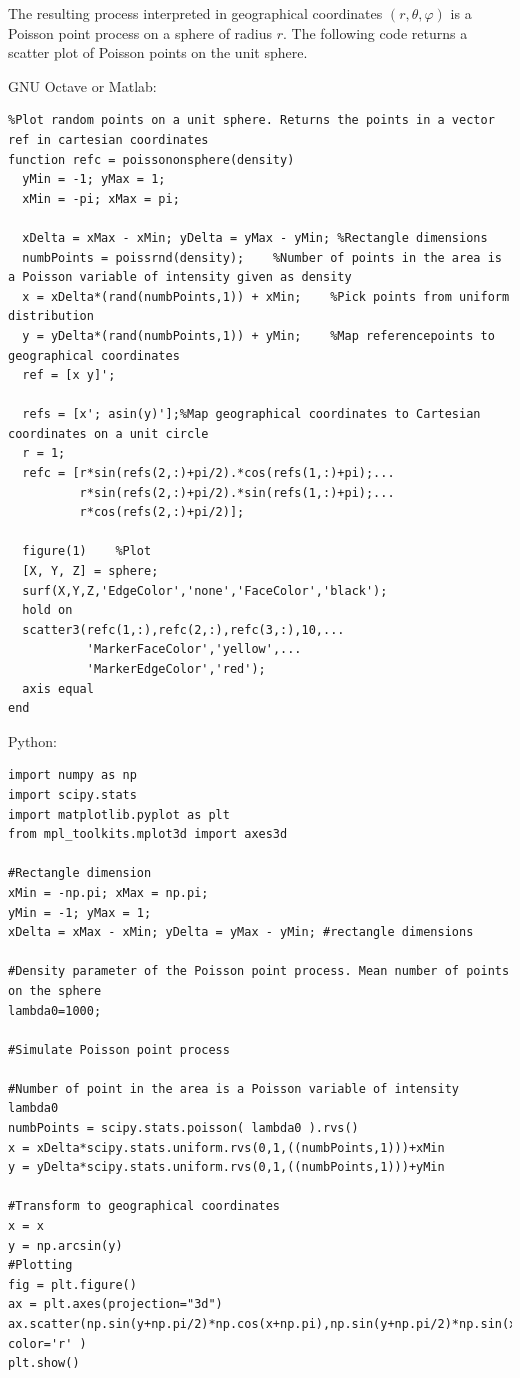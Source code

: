 \documentclass{article}
\begin{document}
        The resulting process interpreted in geographical coordinates $(r,\theta,\varphi)$ is a Poisson point process on a sphere of radius $r$. The following code returns a scatter plot of Poisson points on the unit sphere.



        GNU Octave or Matlab:
\begin{verbatim}
%Plot random points on a unit sphere. Returns the points in a vector ref in cartesian coordinates
function refc = poissononsphere(density)
  yMin = -1; yMax = 1;
  xMin = -pi; xMax = pi;
  
  xDelta = xMax - xMin; yDelta = yMax - yMin; %Rectangle dimensions
  numbPoints = poissrnd(density);    %Number of points in the area is a Poisson variable of intensity given as density
  x = xDelta*(rand(numbPoints,1)) + xMin;    %Pick points from uniform distribution
  y = yDelta*(rand(numbPoints,1)) + yMin;    %Map referencepoints to geographical coordinates
  ref = [x y]';

  refs = [x'; asin(y)'];%Map geographical coordinates to Cartesian coordinates on a unit circle
  r = 1;
  refc = [r*sin(refs(2,:)+pi/2).*cos(refs(1,:)+pi);...
          r*sin(refs(2,:)+pi/2).*sin(refs(1,:)+pi);...
          r*cos(refs(2,:)+pi/2)];

  figure(1)    %Plot
  [X, Y, Z] = sphere;
  surf(X,Y,Z,'EdgeColor','none','FaceColor','black');
  hold on
  scatter3(refc(1,:),refc(2,:),refc(3,:),10,...
           'MarkerFaceColor','yellow',...
           'MarkerEdgeColor','red');
  axis equal
end
\end{verbatim}

Python:

\begin{verbatim}
import numpy as np
import scipy.stats
import matplotlib.pyplot as plt
from mpl_toolkits.mplot3d import axes3d

#Rectangle dimension
xMin = -np.pi; xMax = np.pi;
yMin = -1; yMax = 1;
xDelta = xMax - xMin; yDelta = yMax - yMin; #rectangle dimensions

#Density parameter of the Poisson point process. Mean number of points on the sphere
lambda0=1000; 

#Simulate Poisson point process

#Number of point in the area is a Poisson variable of intensity lambda0
numbPoints = scipy.stats.poisson( lambda0 ).rvs()
x = xDelta*scipy.stats.uniform.rvs(0,1,((numbPoints,1)))+xMin
y = yDelta*scipy.stats.uniform.rvs(0,1,((numbPoints,1)))+yMin

#Transform to geographical coordinates
x = x
y = np.arcsin(y)
#Plotting
fig = plt.figure()
ax = plt.axes(projection="3d")
ax.scatter(np.sin(y+np.pi/2)*np.cos(x+np.pi),np.sin(y+np.pi/2)*np.sin(x+np.pi),np.cos(y+np.pi/2), color='r' )
plt.show()

\end{verbatim}
\end{document}
